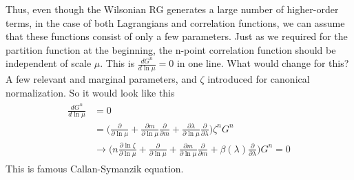 \documentclass[12pt,halfline,a4paper]{ouparticle}
\begin{document}
Thus, even though the Wilsonian RG generates a large number of higher-order terms, in the case of both Lagrangians and correlation functions, we can assume that these functions consist of only a few parameters.
Just as we required for the partition function at the beginning, the n-point correlation function should be independent of scale $\mu$. This is $\frac{dG^{n}}{d\ln\mu}=0$ in one line. What would change for this?
A few relevant and marginal parameters, and $\zeta$ introduced for canonical normalization. So it would look like this
\begin{align}
	\begin{split}
		\frac{dG^{n}}{d\ln\mu}&=0\\
		&=\bigg(\frac{\partial}{\partial\ln\mu}+\frac{\partial m}{\partial\ln\mu}\frac{\partial }{\partial m}+\frac{\partial \lambda}{\partial \ln \mu}\frac{\partial }{\partial\lambda}\bigg)\zeta^n G^n\\
		&\rightarrow\bigg(n\frac{\partial \ln\zeta}{\partial\ln\mu}+\frac{\partial}{\partial\ln\mu}+\frac{\partial m}{\partial\ln\mu}\frac{\partial }{\partial m}+\beta(\lambda)\frac{\partial }{\partial\lambda}\bigg)G^n=0
	\end{split}
\end{align}
This is famous Callan-Symanzik equation. 
\end{document}

